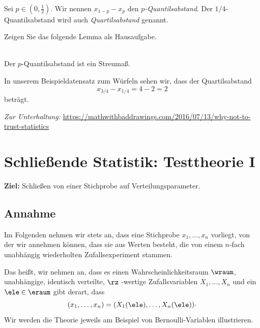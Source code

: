 \begin{defi}[$p$-Quantilsabstand]  \\
    Sei $p\in(0,\tfrac12)$.
    Wir nennen $x_{1-p}-x_p$ den \emph{$p$-Quantilsabstand}.
    Der $1/4$-\gls{Quantilsabstand} wird auch \emph{Quartilsabstand} genannt.
\end{defi}

Zeigen Sie das folgende Lemma als Hausaufgabe.

\begin{lem}  \\
    Der $p$-\gls{Quantilsabstand} ist ein \gls{Streumaß}.
\end{lem}

In unserem Beispieldatensatz zum Würfeln sehen wir, dass der \gls{Quartilsabstand}
\[
    x_{3/4} - x_{1/4} = 4-2 = 2
\]
beträgt.

\bigskip
\noindent\textit{Zur Unterhaltung:} \url{https://mathwithbaddrawings.com/2016/07/13/why-not-to-trust-statistics}

\chapter{Schließende Statistik: Testtheorie I}\label{ch:schlieende-statistik:-testtheorie-i}

\noindent \textbf{Ziel:} Schließen von einer Stichprobe auf Verteilungsparameter.

\section*{Annahme}
Im Folgenden nehmen wir stets an, dass eine Stichprobe $x_1,\dots,x_n$ vorliegt, von der wir annehmen können, dass
sie aus Werten besteht, die von einem $n$-fach unabhängig wiederholten Zufallsexperiment stammen.

Das heißt, wir nehmen an, dass es einen Wahrscheinlichkeitsraum $\wraum$, unabhängige, identisch verteilte, $\rz$
-wertige Zufallsvariablen $X_1,\dots,X_n$ und ein $\ele\in\eraum$ gibt derart, dass
\[
    (x_1,\dots,x_n) = (X_1(\ele),\dots,X_n(\ele)) \cdot
\]
Wir werden die Theorie jeweils am Beispiel von \gls{Bernoulli-Variable}n illustrieren.

